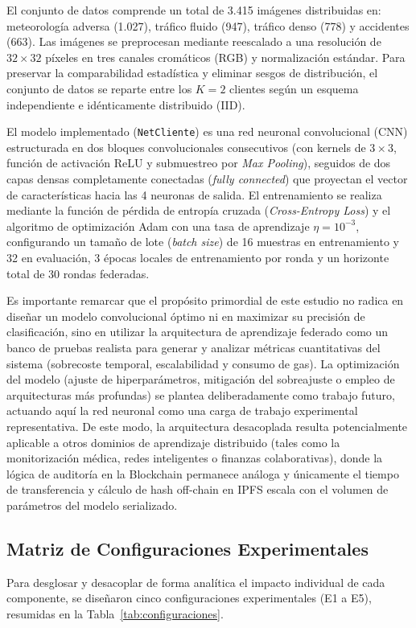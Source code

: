 El conjunto de datos comprende un total de 3.415 imágenes distribuidas en: meteorología adversa (1.027), tráfico fluido (947), tráfico denso (778) y accidentes (663). Las imágenes se preprocesan mediante reescalado a una resolución de $32 \times 32$ píxeles en tres canales cromáticos (RGB) y normalización estándar. Para preservar la comparabilidad estadística y eliminar sesgos de distribución, el conjunto de datos se reparte entre los $K=2$ clientes según un esquema independiente e idénticamente distribuido (IID).

El modelo implementado (\texttt{NetCliente}) es una red neuronal convolucional (CNN) estructurada en dos bloques convolucionales consecutivos (con kernels de $3 \times 3$, función de activación ReLU y submuestreo por \textit{Max Pooling}), seguidos de dos capas densas completamente conectadas (\textit{fully connected}) que proyectan el vector de características hacia las 4 neuronas de salida. El entrenamiento se realiza mediante la función de pérdida de entropía cruzada (\textit{Cross-Entropy Loss}) y el algoritmo de optimización Adam con una tasa de aprendizaje $\eta = 10^{-3}$, configurando un tamaño de lote (\textit{batch size}) de 16 muestras en entrenamiento y 32 en evaluación, 3 épocas locales de entrenamiento por ronda y un horizonte total de 30 rondas federadas.

Es importante remarcar que el propósito primordial de este estudio no radica en diseñar un modelo convolucional óptimo ni en maximizar su precisión de clasificación, sino en utilizar la arquitectura de aprendizaje federado como un banco de pruebas realista para generar y analizar métricas cuantitativas del sistema (sobrecoste temporal, escalabilidad y consumo de gas). La optimización del modelo (ajuste de hiperparámetros, mitigación del sobreajuste o empleo de arquitecturas más profundas) se plantea deliberadamente como trabajo futuro, actuando aquí la red neuronal como una carga de trabajo experimental representativa. De este modo, la arquitectura desacoplada resulta potencialmente aplicable a otros dominios de aprendizaje distribuido (tales como la monitorización médica, redes inteligentes o finanzas colaborativas), donde la lógica de auditoría en la Blockchain permanece análoga y únicamente el tiempo de transferencia y cálculo de hash off-chain en IPFS escala con el volumen de parámetros del modelo serializado.

\subsection{Matriz de Configuraciones Experimentales}
Para desglosar y desacoplar de forma analítica el impacto individual de cada componente, se diseñaron cinco configuraciones experimentales (E1 a E5), resumidas en la Tabla~\ref{tab:configuraciones}.

